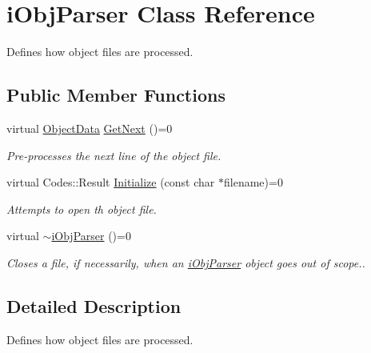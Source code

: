 \hypertarget{classiObjParser}{
\section{iObjParser Class Reference}
\label{classiObjParser}
}


Defines how object files are processed.  


\subsection*{Public Member Functions}
\begin{DoxyCompactItemize}
\item 
virtual \hyperlink{structObjectData}{ObjectData} \hyperlink{classiObjParser_aeb9af4a40a06e755d8b0e493526d82dd}{GetNext} ()=0
\begin{DoxyCompactList}\small\item\em Pre-\/processes the next line of the object file. \item\end{DoxyCompactList}\item 
virtual Codes::Result \hyperlink{classiObjParser_a570e7a7dfb64b66e7a78f75ec4da193a}{Initialize} (const char $\ast$filename)=0
\begin{DoxyCompactList}\small\item\em Attempts to open th object file. \item\end{DoxyCompactList}\item 
\hypertarget{classiObjParser_ae88aacaa19a6aa6d4a7c82c02eabc3dc}{
virtual \hyperlink{classiObjParser_ae88aacaa19a6aa6d4a7c82c02eabc3dc}{$\sim$iObjParser} ()=0}
\label{classiObjParser_ae88aacaa19a6aa6d4a7c82c02eabc3dc}

\begin{DoxyCompactList}\small\item\em Closes a file, if necessarily, when an \hyperlink{classiObjParser}{iObjParser} object goes out of scope.. \item\end{DoxyCompactList}\end{DoxyCompactItemize}


\subsection{Detailed Description}
Defines how object files are processed. 

